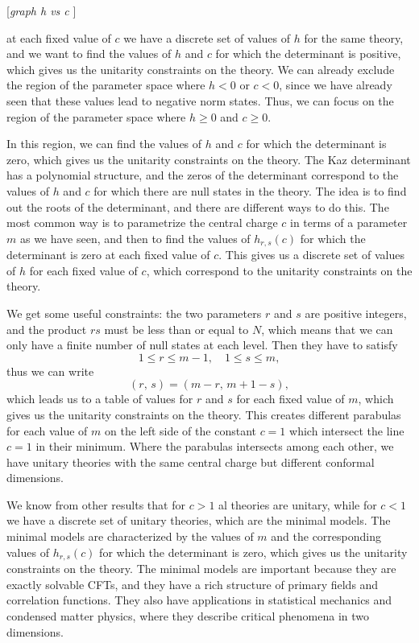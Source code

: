 [\textit{graph h vs c }]

at each fixed value of \(c\) we have a discrete set of values of \(h\) for the same theory, and we want to find the values of \(h\) and \(c\) for which the determinant is positive, which gives us the unitarity constraints on the theory. We can already exclude the region of the parameter space where \(h < 0\) or \(c < 0\), since we have already seen that these values lead to negative norm states. Thus, we can focus on the region of the parameter space where \(h \geq 0\) and \(c \geq 0\).

In this region, we can find the values of \(h\) and \(c\) for which the determinant is zero, which gives us the unitarity constraints on the theory. The Kaz determinant has a polynomial structure, and the zeros of the determinant correspond to the values of \(h\) and \(c\) for which there are null states in the theory. The idea is to find out the roots of the determinant, and there are different ways to do this. The most common way is to parametrize the central charge \(c\) in terms of a parameter \(m\) as we have seen, and then to find the values of \(h_{r,s}(c)\) for which the determinant is zero at each fixed value of \(c\). This gives us a discrete set of values of \(h\) for each fixed value of \(c\), which correspond to the unitarity constraints on the theory.

We get some useful constraints: the two parameters \(r\) and \(s\) are positive integers, and the product \(rs\) must be less than or equal to \(N\), which means that we can only have a finite number of null states at each level. Then they have to satisfy
\[
    1 \leq r \leq m-1, \quad 1 \leq s \leq m,
\]
thus we can write
\[
    (r,\,s) = (m-r,\,m+1-s),
\]
which leads us to a table of values for \(r\) and \(s\) for each fixed value of \(m\), which gives us the unitarity constraints on the theory. This creates different parabulas for each value of \(m\) on the left side of the constant \(c=1\) which intersect the line \(c=1\) in their minimum. Where the parabulas intersects among each other, we have unitary theories with the same central charge but different conformal dimensions.

We know from other results that for \(c>1\) al theories are unitary, while for \(c<1\) we have a discrete set of unitary theories, which are the minimal models. The minimal models are characterized by the values of \(m\) and the corresponding values of \(h_{r,s}(c)\) for which the determinant is zero, which gives us the unitarity constraints on the theory. The minimal models are important because they are exactly solvable CFTs, and they have a rich structure of primary fields and correlation functions. They also have applications in statistical mechanics and condensed matter physics, where they describe critical phenomena in two dimensions.

